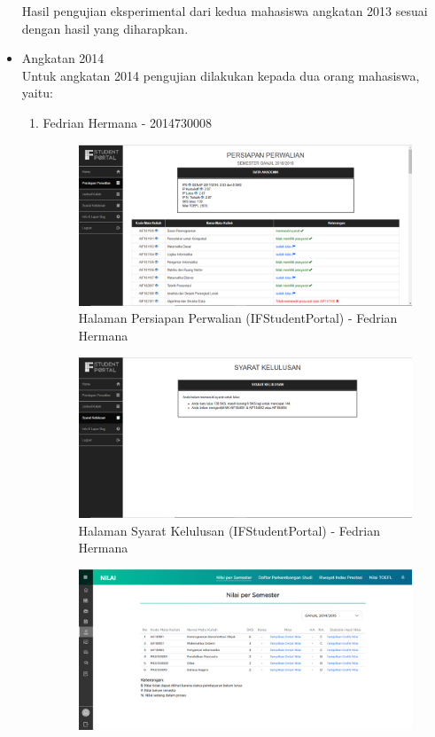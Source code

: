 \begin{itemize}
\begin{enumerate}
	\end{enumerate}
	Hasil pengujian eksperimental dari kedua mahasiswa angkatan 2013 sesuai dengan hasil yang diharapkan.
	\item Angkatan 2014 \\
	Untuk angkatan 2014 pengujian dilakukan kepada dua orang mahasiswa, yaitu:
	\begin{enumerate}
		\item Fedrian Hermana - 2014730008
		\begin{figure}[H]
			\centering
			\includegraphics[scale=0.45]{Gambar/HasilPengujian/2014_1_persiapan_perwalian_ifstudentportal}
			\caption{Halaman Persiapan Perwalian (IFStudentPortal) - Fedrian Hermana}
			\label{fig:2014_1_persiapan_perwalian_ifstudentportal}
		\end{figure}
		\begin{figure}[H]
			\centering
			\includegraphics[scale=0.45]{Gambar/HasilPengujian/2014_1_syarat_kelulusan_ifstudentportal}
			\caption{Halaman Syarat Kelulusan (IFStudentPortal) - Fedrian Hermana}
			\label{fig:2014_1_syarat_kelulusan_ifstudentportal}
		\end{figure}
		\begin{figure}[H]
			\centering
			\includegraphics[scale=0.45]{Gambar/HasilPengujian/2014_1_nps_studentportal}

\end{figure}
\end{enumerate}
\end{itemize}
